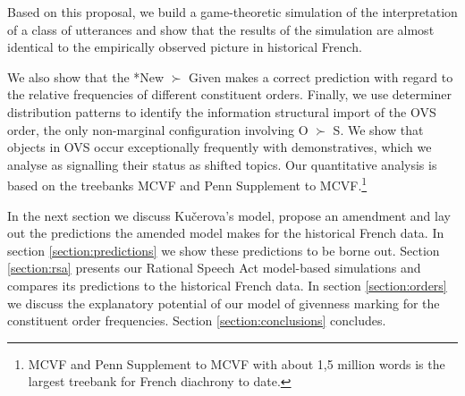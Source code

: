 \documentclass[output=paper,modfonts,nonflat]{langsci/langscibook}
\begin{document}
Based on this proposal, we build a game-theoretic simulation of the interpretation of a class of utterances and show that the results of the simulation are almost identical to the empirically observed picture in historical French. 

We also show that the *New $\succ$ Given makes a correct prediction with regard to the relative frequencies of different constituent orders. Finally, we use determiner distribution patterns to identify the information structural import of the OVS order, the only non-marginal configuration involving O $\succ$ S. We show that objects in OVS occur exceptionally frequently with demonstratives, which we analyse as signalling their status as shifted topics. Our quantitative analysis is based on the treebanks MCVF and Penn Supplement to MCVF.\footnote{MCVF and Penn Supplement to MCVF with about 1,5 million words is the largest treebank for French diachrony to date.} 

In the next section we discuss Ku\v{c}erova's model, propose an amendment and lay out the predictions the amended model makes for the historical French data. In section \ref{section:predictions} we show these predictions to be borne out. Section \ref{section:rsa} presents our Rational Speech Act model-based simulations and compares its predictions to the historical French data. In section \ref{section:orders} we discuss the explanatory potential of our model of givenness marking for the constituent order frequencies. Section \ref{section:conclusions} concludes. 

\nocite{MCVF}
\nocite{Penn}


\end{document}
